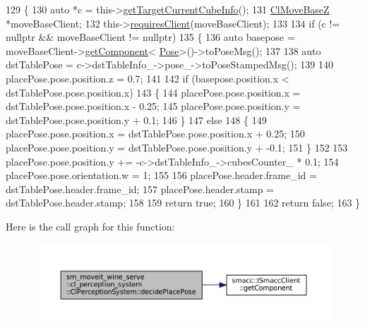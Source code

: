 \begin{DoxyCode}
129             \{
130                 \textcolor{keyword}{auto} *c = this->\hyperlink{classsm__moveit__wine__serve_1_1cl__perception__system_1_1ClPerceptionSystem_a13bcd31217e9eda88d966d3ec142a465}{getTargetCurrentCubeInfo}();
131                 \hyperlink{classcl__move__base__z_1_1ClMoveBaseZ}{ClMoveBaseZ} *moveBaseClient;
132                 this->\hyperlink{classsmacc_1_1ISmaccClient_a7a9990a2f3e35d547671188d69fee520}{requiresClient}(moveBaseClient);
133 
134                 \textcolor{keywordflow}{if} (c != \textcolor{keyword}{nullptr} && moveBaseClient != \textcolor{keyword}{nullptr})
135                 \{
136                     \textcolor{keyword}{auto} basepose = moveBaseClient->\hyperlink{classsmacc_1_1ISmaccClient_adef78db601749ca63c19e74a27cb88cc}{getComponent}<
      \hyperlink{classcl__move__base__z_1_1Pose}{Pose}>()->toPoseMsg();
137 
138                     \textcolor{keyword}{auto} dstTablePose = c->dstTableInfo\_->pose\_->toPoseStampedMsg();
139 
140                     placePose.pose.position.z = 0.7;
141 
142                     \textcolor{keywordflow}{if} (basepose.position.x < dstTablePose.pose.position.x)
143                     \{
144                         placePose.pose.position.x = dstTablePose.pose.position.x - 0.25;
145                         placePose.pose.position.y = dstTablePose.pose.position.y + 0.1;
146                     \}
147                     \textcolor{keywordflow}{else}
148                     \{
149                         placePose.pose.position.x = dstTablePose.pose.position.x + 0.25;
150                         placePose.pose.position.y = dstTablePose.pose.position.y + -0.1;
151                     \}
152 
153                     placePose.pose.position.y += -c->dstTableInfo\_->cubesCounter\_ * 0.1;
154                     placePose.pose.orientation.w = 1;
155 
156                     placePose.header.frame\_id = dstTablePose.header.frame\_id;
157                     placePose.header.stamp = dstTablePose.header.stamp;
158 
159                     \textcolor{keywordflow}{return} \textcolor{keyword}{true};
160                 \}
161 
162                 \textcolor{keywordflow}{return} \textcolor{keyword}{false};
163             \}
\end{DoxyCode}
Here is the call graph for this function\+:
\nopagebreak
\begin{figure}[H]
\begin{center}
\leavevmode
\includegraphics[width=350pt]{classsm__moveit__wine__serve_1_1cl__perception__system_1_1ClPerceptionSystem_a933bd942b37429d282180d19734aab85_cgraph}
\end{center}
\end{figure}
